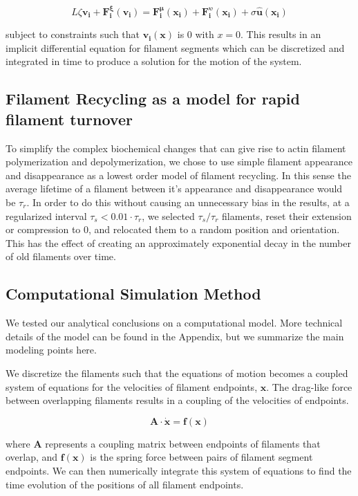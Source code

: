 \documentclass[10pt,letterpaper]{article}
\begin{document}
\begin{equation}
L\zeta\mathbf{ v_i} +\mathbf{F^{\xi}_i(v_i)}= \mathbf{F^{\mu}_i(x_i)}+\mathbf{F^{\upsilon}_i(x_i)} + \sigma\mathbf{\hat{u}(x_i)}
\end{equation}

subject to constraints such that $\mathbf{v_i(x)}$ is 0 with $x=0$.  This results in an implicit differential equation for filament segments which can be discretized and integrated in time to produce a solution for the motion of the system.


\subsection*{Filament Recycling as a model for rapid filament turnover}

To simplify the complex biochemical changes that can give rise to actin filament polymerization and depolymerization, we chose to use simple filament appearance and disappearance as a lowest order model of filament recycling.  In this sense the average lifetime of a filament between it's appearance and disappearance would be $\tau_r$.  In order to do this without causing an unnecessary bias in the results, at a regularized interval $\tau_s < 0.01\cdot\tau_r$, we selected $\tau_s/\tau_r$ filaments, reset their extension or compression to 0, and relocated them to a random position and orientation.  This has the effect of creating an approximately exponential decay in the number of old filaments over time.


\subsection*{Computational Simulation Method}

We tested our analytical conclusions on a computational model.  More technical details of the model can be found in the Appendix, but we summarize the main modeling points here.

We discretize the filaments such that the equations of motion becomes a coupled system of equations for the velocities of filament endpoints, $\mathbf{x}$.  The drag-like force between overlapping filaments results in a coupling of the velocities of endpoints.  

\begin{equation}
\mathbf{A \cdot \dot x} = \mathbf{f(x)}
\end{equation}

where $\mathbf{A }$ represents a coupling matrix between endpoints of filaments that overlap, and $\mathbf{f(x)}$ is the spring force between pairs of filament segment endpoints.  We can then numerically integrate this system of equations to find the time evolution of the positions of all filament endpoints.
\end{document}
